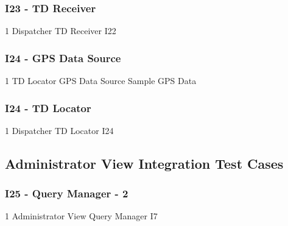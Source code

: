 \subsubsection{I23 - TD Receiver}
\testCaseSimpleSimple
	{1}
	{Dispatcher}
	{TD Receiver}
	{I22}
\subsubsection{I24 - GPS Data Source}
\testCaseSimpleSimple
	{1}
	{TD Locator}
	{GPS Data Source}
	{Sample GPS Data}
\subsubsection{I24 - TD Locator}
\testCaseSimpleSimple
	{1}
	{Dispatcher}
	{TD Locator}
	{I24}
\subsection{Administrator View Integration Test Cases}
\subsubsection{I25 - Query Manager - 2}
\testCaseSimpleSimple
	{1}
	{Administrator View}
	{Query Manager}
	{I7}